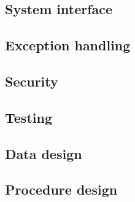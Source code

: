 \documentclass{article}
\begin{document}
\subsection{System interface}

\subsection{Exception handling}

\subsection{Security}

\subsection{Testing}

\subsection{Data design}

\subsection{Procedure design}


%
%
\newpage
\end{document}
